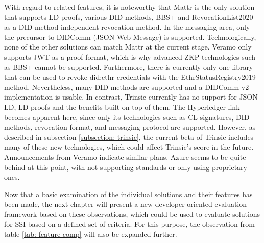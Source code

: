     With regard to related features, it is noteworthy that Mattr is the only solution that supports LD proofs, various \ac{DID} methods, BBS+ and RevocationList2020 as a \ac{DID} method independent revocation method. In the messaging area, only the precursor to DIDComm (JSON Web Message) is supported. Technologically, none of the other solutions can match Mattr at the current stage. Veramo only supports JWT as a proof format, which is why advanced ZKP technologies such as BBS+ cannot be supported. Furthermore, there is currently only one library that can be used to revoke did:ethr credentials with the EthrStatusRegistry2019 method. Nevertheless, many \ac{DID} methods are supported and a DIDComm v2 implementation is usable. In contrast, Trinsic currently has no support for JSON-LD, LD proofs and the benefits built on top of them. The Hyperledger link becomes apparent here, since only its technologies such as CL signatures, \ac{DID} methods, revocation format, and messaging protocol are supported. However, as described in subsection \ref{subsection: trinsic}, the current beta of Trinsic includes many of these new technologies, which could affect Trinsic's score in the future. Announcements from Veramo indicate similar plans. Azure seems to be quite behind at this point, with not supporting standards or only using proprietary ones.
    
    Now that a basic examination of the individual solutions and their features has been made, the next chapter will present a new developer-oriented evaluation framework based on these observations, which could be used to evaluate solutions for \ac{SSI} based on a defined set of criteria. For this purpose, the observation from table \ref{tab: feature comp} will also be expanded further. 
    
    
    